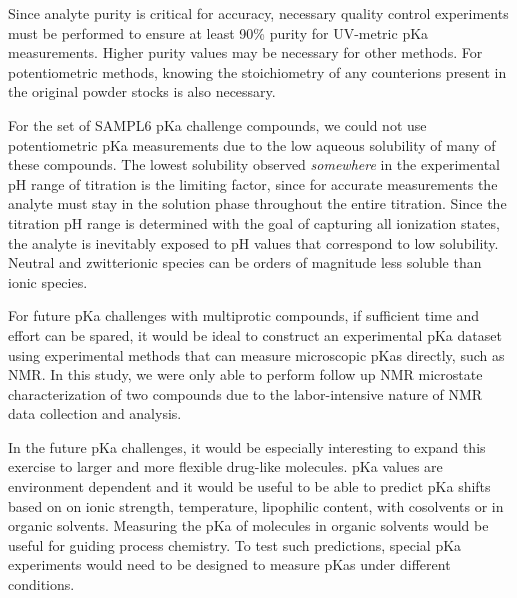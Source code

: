 \documentclass[9pt,lineno]{elife}
\begin{document}
Since analyte purity is critical for accuracy, necessary quality control experiments must be performed to ensure at least 90\% purity for UV-metric pKa measurements. Higher purity values may be necessary for other methods. 
For potentiometric methods, knowing the stoichiometry of any counterions present in the original powder stocks is also necessary.

For the set of SAMPL6 pKa challenge compounds, we could not use potentiometric pKa measurements due to the low aqueous solubility of many of these compounds. The lowest solubility observed \emph{somewhere} in the experimental pH range of titration is the limiting factor, since for accurate measurements the analyte must stay in the solution phase throughout the entire titration. 
Since the titration pH range is determined with the goal of capturing all ionization states, the analyte is inevitably exposed to pH values that correspond to low solubility. 
Neutral and zwitterionic species can be orders of magnitude less soluble than ionic species. 

For future pKa challenges with multiprotic compounds, if sufficient time and effort can be spared, it would be ideal to construct an experimental pKa dataset using experimental methods that can measure microscopic pKas directly, such as NMR. 
In this study, we were only able to perform follow up NMR microstate characterization of two compounds due to the labor-intensive nature of NMR data collection and analysis. 

In the future pKa challenges, it would be especially interesting to expand this exercise to larger and more flexible drug-like molecules. 
pKa values are environment dependent and it would be useful to be able to predict pKa shifts based on on ionic strength, temperature, lipophilic content, with cosolvents or in organic solvents. 
Measuring the pKa of molecules in organic solvents would be useful for guiding process chemistry. 
To test such predictions, special pKa experiments would need to be designed to measure pKas under different conditions.

\end{document}
